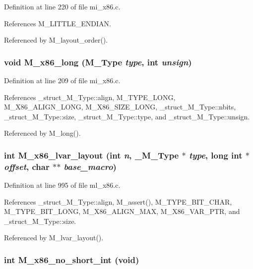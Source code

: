 Definition at line 220 of file mi\_\-x86.c.

References M\_\-LITTLE\_\-ENDIAN.

Referenced by M\_\-layout\_\-order().
\subsubsection{\setlength{\rightskip}{0pt plus 5cm}void M\_\-x86\_\-long (\bf{M\_\-Type} {\em type}, int {\em unsign})}\label{m__x86_8h_786bdf3a1143379eeaa1eacf8a0927f5}




Definition at line 209 of file mi\_\-x86.c.

References \_\-struct\_\-M\_\-Type::align, M\_\-TYPE\_\-LONG, M\_\-X86\_\-ALIGN\_\-LONG, M\_\-X86\_\-SIZE\_\-LONG, \_\-struct\_\-M\_\-Type::nbits, \_\-struct\_\-M\_\-Type::size, \_\-struct\_\-M\_\-Type::type, and \_\-struct\_\-M\_\-Type::unsign.

Referenced by M\_\-long().
\subsubsection{\setlength{\rightskip}{0pt plus 5cm}int M\_\-x86\_\-lvar\_\-layout (int {\em n}, \bf{\_\-M\_\-Type} $\ast$ {\em type}, long int $\ast$ {\em offset}, char $\ast$$\ast$ {\em base\_\-macro})}\label{m__x86_8h_cdbd8746178fd2d03ff8fdc78eeee4ad}




Definition at line 995 of file ml\_\-x86.c.

References \_\-struct\_\-M\_\-Type::align, M\_\-assert(), M\_\-TYPE\_\-BIT\_\-CHAR, M\_\-TYPE\_\-BIT\_\-LONG, M\_\-X86\_\-ALIGN\_\-MAX, M\_\-X86\_\-VAR\_\-PTR, and \_\-struct\_\-M\_\-Type::size.

Referenced by M\_\-lvar\_\-layout().
\subsubsection{\setlength{\rightskip}{0pt plus 5cm}int M\_\-x86\_\-no\_\-short\_\-int (void)}\label{m__x86_8h_1b6a39fb220cdc71ba2d2222668ed953}




